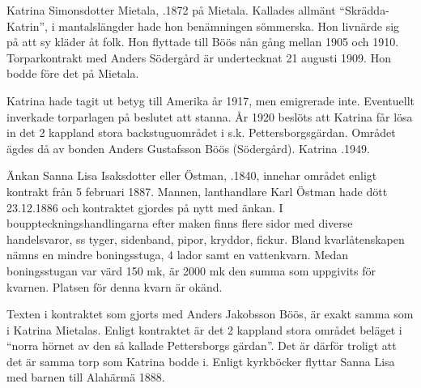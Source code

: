 Katrina Simonsdotter Mietala, .1872 på Mietala. Kallades allmänt ``Skrädda-Katrin'', i mantalslängder hade hon benämningen sömmerska. Hon livnärde sig på att sy kläder åt folk. Hon flyttade till Böös nån gång mellan 1905 och 1910. Torparkontrakt med Anders Södergård är undertecknat 21 augusti 1909. Hon bodde före det på Mietala.

Katrina hade tagit ut betyg till Amerika år 1917, men emigrerade inte. Eventuellt inverkade torparlagen på beslutet att stanna. År 1920 beslöts att Katrina får lösa in det 2 kappland stora backstuguområdet i s.k. Pettersborgsgärdan. Området ägdes då av bonden Anders 				Gustafsson Böös (Södergård). Katrina .1949.


Änkan Sanna Lisa Isaksdotter eller Östman, .1840, innehar området enligt kontrakt från 5 februari 1887. Mannen, lanthandlare Karl Östman hade dött 23.12.1886 och kontraktet gjordes på nytt med änkan. I bouppteckningshandlingarna efter maken finns flere sidor med diverse handelsvaror, ss tyger, sidenband, pipor, kryddor, fickur. Bland kvarlåtenskapen nämns en mindre boningsstuga, 4 lador samt en vattenkvarn. Medan boningsstugan var värd 150 mk, är 2000 mk den summa som uppgivits för kvarnen. Platsen för denna kvarn är okänd.

Texten i kontraktet som gjorts med Anders Jakobsson Böös, är exakt samma som i Katrina Mietalas. Enligt kontraktet är det 2 kappland stora området beläget i ``norra hörnet av den så kallade Pettersborgs gärdan''. Det är därför troligt att det är samma torp som Katrina bodde i. Enligt kyrkböcker flyttar Sanna Lisa med barnen till Alahärmä 1888.
\begin{jhchildren}
  \item {}
  \item {}
  \item {}
\end{jhchildren}


